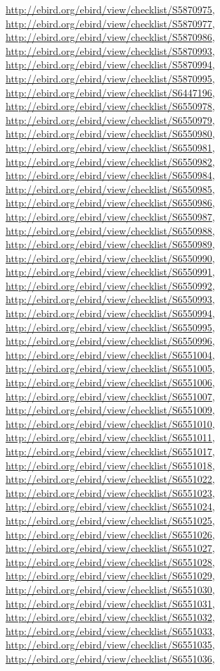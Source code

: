\documentclass[9pt, article]{memoir}
\begin{document}
\begin{multicols}{2}
\url{http://ebird.org/ebird/view/checklist/S5870975}, 
\url{http://ebird.org/ebird/view/checklist/S5870977}, 
\url{http://ebird.org/ebird/view/checklist/S5870986}, 
\url{http://ebird.org/ebird/view/checklist/S5870993}, 
\url{http://ebird.org/ebird/view/checklist/S5870994}, 
\url{http://ebird.org/ebird/view/checklist/S5870995}, 
\url{http://ebird.org/ebird/view/checklist/S6447196}, 
\url{http://ebird.org/ebird/view/checklist/S6550978}, 
\url{http://ebird.org/ebird/view/checklist/S6550979}, 
\url{http://ebird.org/ebird/view/checklist/S6550980}, 
\url{http://ebird.org/ebird/view/checklist/S6550981}, 
\url{http://ebird.org/ebird/view/checklist/S6550982}, 
\url{http://ebird.org/ebird/view/checklist/S6550984}, 
\url{http://ebird.org/ebird/view/checklist/S6550985}, 
\url{http://ebird.org/ebird/view/checklist/S6550986}, 
\url{http://ebird.org/ebird/view/checklist/S6550987}, 
\url{http://ebird.org/ebird/view/checklist/S6550988}, 
\url{http://ebird.org/ebird/view/checklist/S6550989}, 
\url{http://ebird.org/ebird/view/checklist/S6550990}, 
\url{http://ebird.org/ebird/view/checklist/S6550991}, 
\url{http://ebird.org/ebird/view/checklist/S6550992}, 
\url{http://ebird.org/ebird/view/checklist/S6550993}, 
\url{http://ebird.org/ebird/view/checklist/S6550994}, 
\url{http://ebird.org/ebird/view/checklist/S6550995}, 
\url{http://ebird.org/ebird/view/checklist/S6550996}, 
\url{http://ebird.org/ebird/view/checklist/S6551004}, 
\url{http://ebird.org/ebird/view/checklist/S6551005}, 
\url{http://ebird.org/ebird/view/checklist/S6551006}, 
\url{http://ebird.org/ebird/view/checklist/S6551007}, 
\url{http://ebird.org/ebird/view/checklist/S6551009}, 
\url{http://ebird.org/ebird/view/checklist/S6551010}, 
\url{http://ebird.org/ebird/view/checklist/S6551011}, 
\url{http://ebird.org/ebird/view/checklist/S6551017}, 
\url{http://ebird.org/ebird/view/checklist/S6551018}, 
\url{http://ebird.org/ebird/view/checklist/S6551022}, 
\url{http://ebird.org/ebird/view/checklist/S6551023}, 
\url{http://ebird.org/ebird/view/checklist/S6551024}, 
\url{http://ebird.org/ebird/view/checklist/S6551025}, 
\url{http://ebird.org/ebird/view/checklist/S6551026}, 
\url{http://ebird.org/ebird/view/checklist/S6551027}, 
\url{http://ebird.org/ebird/view/checklist/S6551028}, 
\url{http://ebird.org/ebird/view/checklist/S6551029}, 
\url{http://ebird.org/ebird/view/checklist/S6551030}, 
\url{http://ebird.org/ebird/view/checklist/S6551031}, 
\url{http://ebird.org/ebird/view/checklist/S6551032}, 
\url{http://ebird.org/ebird/view/checklist/S6551033}, 
\url{http://ebird.org/ebird/view/checklist/S6551035}, 
\url{http://ebird.org/ebird/view/checklist/S6551036}, 

\end{multicols}
\end{document}
